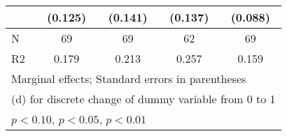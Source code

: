 {\begin{tabular}{l*{4}{c}}
                    &     (0.125)         &     (0.141)         &     (0.137)         &     (0.088)         \\
\hline
N                   &          69         &          69         &          62         &          69         \\
R2                  &       0.179         &       0.213         &       0.257         &       0.159         \\
\hline\hline
\multicolumn{5}{l}{\footnotesize Marginal effects; Standard errors in parentheses}\\
\multicolumn{5}{l}{\footnotesize  (d) for discrete change of dummy variable from 0 to 1}\\
\multicolumn{5}{l}{\footnotesize \sym{*} \(p<0.10\), \sym{**} \(p<0.05\), \sym{***} \(p<0.01\)}\\
\end{tabular}
}
